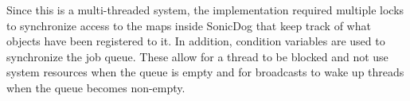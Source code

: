 Since this is a multi-threaded system, the implementation required multiple
locks to synchronize access to the maps inside SonicDog that keep track of what
objects have been registered to it. In addition, condition variables are used to
synchronize the job queue. These allow for a thread to be blocked and not use 
system resources when the queue is empty and for broadcasts to wake up threads 
when the queue becomes non-empty.

